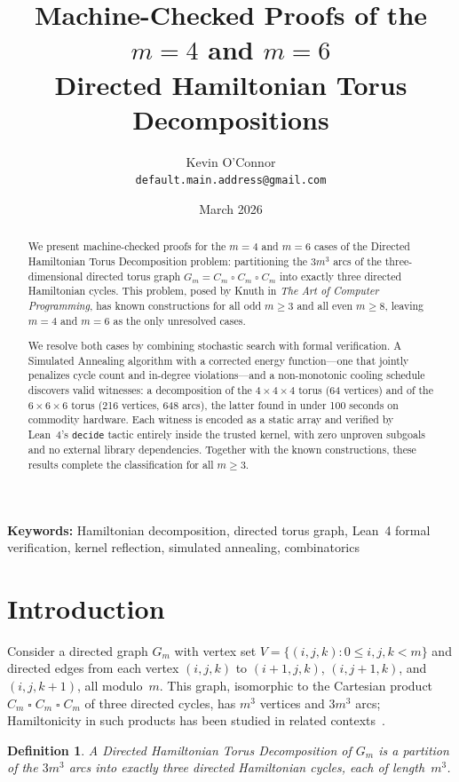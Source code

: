\documentclass[11pt]{article}
\title{Machine-Checked Proofs of the $m=4$ and $m=6$ \\
Directed Hamiltonian Torus Decompositions}
\author{
  Kevin O'Connor\\
  \texttt{default.main.address@gmail.com}
}
\date{March 2026}
\theoremstyle{plain}
\newtheorem{definition}{Definition}
\begin{document}
\maketitle

\begin{abstract}
We present machine-checked proofs for the $m=4$ and $m=6$ cases of the
Directed Hamiltonian Torus Decomposition problem: partitioning the $3m^3$ arcs
of the three-dimensional directed torus graph $G_m = C_m \mathbin{\square}
C_m \mathbin{\square} C_m$ into exactly three directed Hamiltonian cycles.
This problem, posed by Knuth in \emph{The Art of Computer Programming}, has
known constructions for all odd $m \geq 3$ and all even $m \geq 8$, leaving
$m = 4$ and $m = 6$ as the only unresolved cases.

We resolve both cases by combining stochastic search with formal verification.
A Simulated Annealing algorithm with a corrected energy function---one that
jointly penalizes cycle count and in-degree violations---and a non-monotonic
cooling schedule discovers valid witnesses: a decomposition of the
$4{\times}4{\times}4$ torus (64 vertices) and of the $6{\times}6{\times}6$
torus (216 vertices, 648 arcs), the latter found in under 100 seconds on
commodity hardware. Each witness is encoded as a static array and verified by
Lean~4's \texttt{decide} tactic entirely inside the trusted kernel, with zero
unproven subgoals and no external library dependencies. Together with the known
constructions, these results complete the classification for all $m \geq 3$.
\end{abstract}

\noindent\textbf{Keywords:} Hamiltonian decomposition, directed torus graph,
Lean~4 formal verification, kernel reflection, simulated annealing, combinatorics

\section{Introduction}

Consider a directed graph $G_m$ with vertex set
$V = \{(i, j, k) : 0 \le i, j, k < m\}$ and directed edges from each vertex
$(i,j,k)$ to $(i{+}1, j, k)$, $(i, j{+}1, k)$, and $(i, j, k{+}1)$, all
modulo~$m$. This graph, isomorphic to the Cartesian product
$C_m \mathbin{\square} C_m \mathbin{\square} C_m$ of three directed cycles,
has $m^3$ vertices and $3m^3$ arcs; Hamiltonicity in such products has
been studied in related contexts~\cite{darijani2025}.

\begin{definition}
A \emph{Directed Hamiltonian Torus Decomposition} of $G_m$ is a partition of
the $3m^3$ arcs into exactly three directed Hamiltonian cycles, each of
length~$m^3$.
\end{definition}
\end{document}
